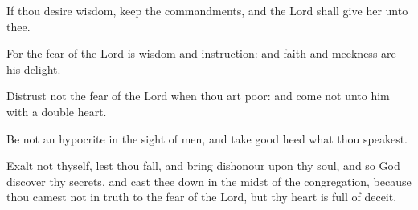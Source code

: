 {\par }{\PP {}If thou desire wisdom, keep the commandments, and the Lord shall give her unto thee.
\par }{\PP {}For the fear of the Lord is wisdom and instruction: and faith and meekness are his delight.
\par }{\PP {}Distrust not the fear of the Lord when thou art poor: and come not unto him with a double heart.
\par }{\PP {}Be not an hypocrite in the sight of men, and take good heed what thou speakest.
\par }{\PP {}Exalt not thyself, lest thou fall, and bring dishonour upon thy soul, and so God discover thy secrets, and cast thee down in the midst of the congregation, because thou camest not in truth to the fear of the Lord, but thy heart is full of deceit.

}
